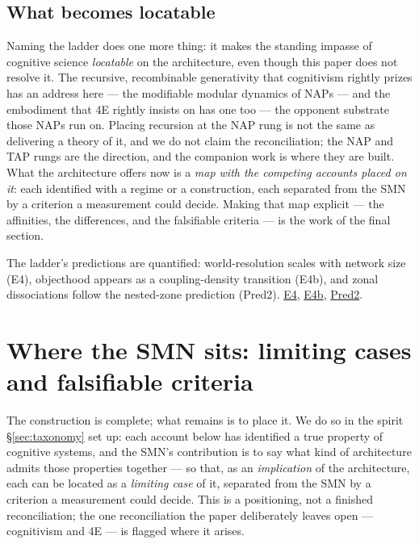 \documentclass{article}
\newcommand{\rtdlink}[2]{\href{https://smn-lab.readthedocs.io/en/latest/#1}{#2}}
\begin{document}
\subsection{What becomes locatable}\label{sec:tax-locatable}

Naming the ladder does one more thing: it makes the standing impasse of
cognitive science \emph{locatable} on the architecture, even though this
paper does not resolve it.  The recursive, recombinable generativity that
cognitivism rightly prizes has an address here --- the modifiable
modular dynamics of NAPs --- and the embodiment that 4E rightly insists
on has one too --- the opponent substrate those NAPs run on.  Placing
recursion at the NAP rung is not the same as delivering a theory of it,
and we do not claim the reconciliation; the NAP and TAP rungs are the
direction, and the companion work is where they are built.  What the
architecture offers now is a \emph{map with the competing accounts
placed on it}: each identified with a regime or a construction, each
separated from the SMN by a criterion a measurement could decide.  Making
that map explicit --- the affinities, the differences, and the
falsifiable criteria --- is the work of the final section.

\begin{benchbox}
The ladder's predictions are quantified: world-resolution scales with
network size (E4), objecthood appears as a coupling-density transition
(E4b), and zonal dissociations follow the nested-zone prediction (Pred2).
\rtdlink{experiments/p7_scaling_network/}{E4},
\rtdlink{experiments/p8_objecthood_transition/}{E4b},
\rtdlink{experiments/sweep_pred2_zonal/}{Pred2}.
\end{benchbox}

\section{Where the SMN sits: limiting cases and falsifiable criteria}\label{sec:related}

The construction is complete; what remains is to place it.  We do so in
the spirit \S\ref{sec:taxonomy} set up: each account below has identified
a true property of cognitive systems, and the SMN's contribution is to
say what kind of architecture admits those properties together --- so
that, as an \emph{implication} of the architecture, each can be located
as a \emph{limiting case} of it, separated from the SMN by a criterion a
measurement could decide.  This is a positioning, not a finished
reconciliation; the one reconciliation the paper deliberately leaves open
--- cognitivism and 4E --- is flagged where it arises.
\end{document}
